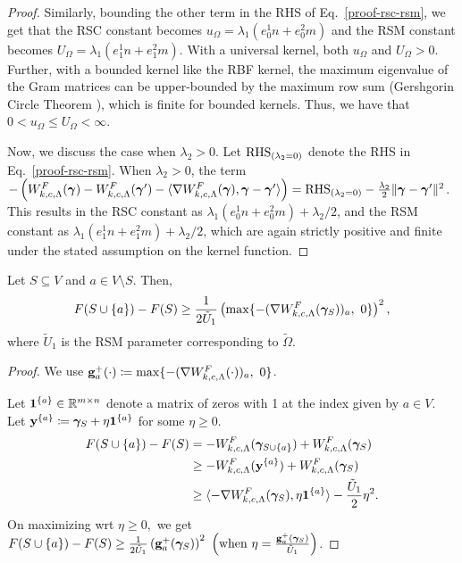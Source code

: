 \begin{proof}


Similarly, bounding the other term in the RHS of Eq.~\ref{proof-rsc-rsm}, we get that the RSC constant becomes $u_\Omega=\lambda_1(e^1_0n+e^2_0m)$ and the RSM constant becomes $U_\Omega=\lambda_1(e^1_1n + e^2_1m)$. 
With a universal kernel, both $u_\Omega$ and $U_\Omega>0$. Further, with a bounded kernel like the RBF kernel, the maximum eigenvalue of the Gram matrices can be upper-bounded by the maximum row sum (Gershgorin Circle Theorem \citep{gershgorin1931uber}), which is finite for bounded kernels. Thus, we have that $0<u_\Omega \leq U_\Omega<\infty$.

Now, we discuss the case when $\lambda_2>0$. Let $\rm{RHS}_{(\lambda_2=0)}$ denote the RHS in Eq.~\ref{proof-rsc-rsm}. When $\lambda_2>0$, the term $-\left(W^F_{k, c, \Lambda}(\bm{\gamma})  - W^F_{k, c, \Lambda}(\bm{\gamma}')-\langle\nabla W^F_{k, c, \Lambda}(\bm{\gamma}), \bm{\gamma}-\bm{\gamma}'\rangle\right) = \rm{RHS}_{(\lambda_2=0)} -\frac{\lambda_2}{2}\|\bm{\gamma}-\bm{\gamma}'\|^2$. This results in the RSC constant as $\lambda_1(e_0^1n+e_0^2m)+\lambda_2/2$, and the RSM constant as $\lambda_1(e_1^1n+e_1^2m)+\lambda_2/2$, which are again strictly positive and finite under the stated assumption on the kernel function.
\end{proof}

\begin{lemma}\label{lemma2.1}
Let $S\subseteq V$ and $a\in V\setminus S$. Then,
$$F(S\cup \u) - F(S)\geq \frac{1}{2\tilde{U}_1}\left(\max\{-(\nabla \calWF(\bgamma_S))_a,\ 0\}\right)^2,$$
where $\tilde{U}_1$ is the RSM parameter corresponding to $\tilde{\Omega}$.
\end{lemma}
\begin{proof}
We use $\mathbf{g}^+_a(\cdot)\coloneqq \max\{-(\nabla W^F_{k, c, \Lambda}(\cdot))_a,\ 0\}$.

Let $\mathbf{1}^{\{a\}}\in \mathbb{R}^{m\times n}$ denote a matrix of zeros with 1 at the index given by $a\in V$. Let $\mathbf{y}^{\{a\}}\coloneqq\bm{\gamma}_S+\eta \mathbf{1}^{\{a\}}$ for some $\eta\geq 0$.
\begin{align*}
F(S\cup \{a\})-F(S) &= -W^F_{k, c, \Lambda}(\bm{\gamma}_{S\cup \{a\}})+W^F_{k, c, \Lambda}(\bm{\gamma}_S)\\
& \geq -W^F_{k, c, \Lambda}(\mathbf{y}^{\{a\}}) + W^F_{k, c, \Lambda}(\bm{\gamma}_S)\\
& \geq \langle-\nabla W^F_{k, c, \Lambda}(\bm{\gamma}_S), \eta \mathbf{1}^{\{a\}} \rangle-\frac{\tilde{U}_1}{2}\eta^2.
\end{align*}
On maximizing wrt $\eta\geq 0,$ we get $F(S\cup \u) - F(S)\geq \frac{1}{2\tilde{U}_1} \left( \mathbf{g}_a^+(\bgamma_S)\right)^2 \ \left(\textup{when }\eta = \frac{\mathbf{g}^+_a(\bgamma_S)}{\tilde{U}_1}\right)$.
\end{proof}

